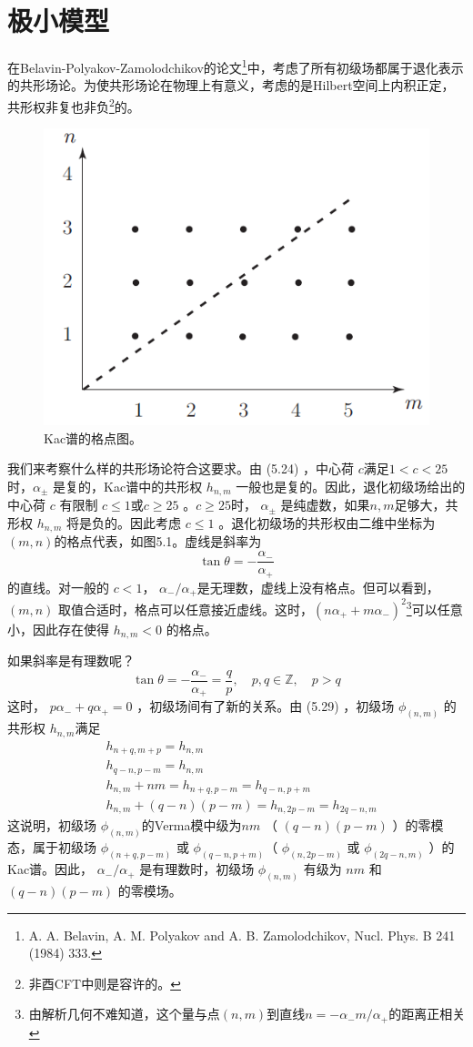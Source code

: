 \section{极小模型}
在Belavin-Polyakov-Zamolodchikov的论文\footnote{A. A. Belavin, A. M. Polyakov and A. B. Zamolodchikov, Nucl. Phys. B 241 (1984) 333.}中，考虑了所有初级场都属于退化表示的共形场论。为使共形场论在物理上有意义，考虑的是Hilbert空间上内积正定，共形权非复也非负\footnote{非酉CFT中则是容许的。}的。

\begin{figure}[h]
	\centering
	\includegraphics[width=0.6\linewidth]{fig/5.1.png}
	\caption{Kac谱的格点图。}
\end{figure}

我们来考察什么样的共形场论符合这要求。由 (5.24) ，中心荷 $c $满足$ 1<c<25$ 时，$ \alpha_\pm$ 是复的，Kac谱中的共形权 $h_{n,m}$ 一般也是复的。因此，退化初级场给出的中心荷 $c$ 有限制 $c\leq 1 $或$c\geq 25$ 。$ c\geq 25$时， $\alpha_\pm$ 是纯虚数，如果$n,m $足够大，共形权 $h_{n,m}$ 将是负的。因此考虑 $c\leq 1$ 。退化初级场的共形权由二维中坐标为$ (m,n) $的格点代表，如图5.1。虚线是斜率为
$$
\tan \theta=-\frac{\alpha_{-}}{\alpha_{+}}
$$
的直线。对一般的 $c<1 $， $\alpha_-/\alpha_+ $是无理数，虚线上没有格点。但可以看到， $(m,n)$ 取值合适时，格点可以任意接近虚线。这时，$ \left(n \alpha_{+}+m \alpha_{-}\right)^{2} $\footnote{由解析几何不难知道，这个量与点$ (n,m) $到直线$ n=-\alpha_- m/\alpha_+ $的距离正相关}可以任意小，因此存在使得 $h_{n,m}<0$ 的格点。

如果斜率是有理数呢？
\begin{equation}
\tan \theta=-\frac{\alpha_{-}}{\alpha_{+}}=\frac{q}{p}, \quad p, q \in \mathbb{Z}, \quad p>q
\end{equation}
这时， $p \alpha_{-}+q \alpha_{+}=0$ ，初级场间有了新的关系。由 (5.29) ，初级场 $\phi_{(n, m)}$ 的共形权 $h_{n,m} $满足
\begin{align} &h_{n+q, m+p}=h_{n, m}\\ &h_{q-n, p-m}=h_{n, m} \\ &h_{n, m}+n m=h_{n+q, p-m}=h_{q-n, p+m} \\ &h_{n, m}+(q-n)(p-m)=h_{n, 2 p-m}=h_{2 q-n, m} \end{align}
这说明，初级场 $\phi_{(n, m)} $的Verma模中级为$ nm$ （ $(q-n)(p-m)$ ）的零模态，属于初级场 $\phi_{(n+q, p-m)}$ 或 $\phi_{(q-n, p+m)} $（ $\phi_{(n, 2p-m)}$ 或 $\phi_{(2q-n, m)}$ ）的Kac谱。因此， $\alpha_-/\alpha_+$ 是有理数时，初级场 $\phi_{(n, m)}$ 有级为 $nm$ 和 $(q-n)(p-m)$ 的零模场。


